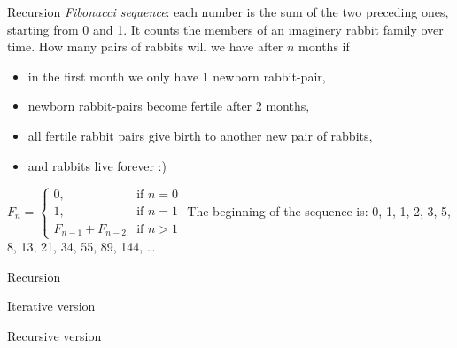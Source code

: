 \documentclass[usenames,dvipsnames,aspectratio=169]{beamer}
\begin{document}
\begin{frame}{Recursion}
  \emph{Fibonacci sequence}: each number is the sum of the two preceding ones, starting from 0 and 1. It counts the members of an imaginery rabbit family over time. How many pairs of rabbits will we have after $n$ months if
  \begin{itemize}
    \item in the first month we only have 1 newborn rabbit-pair,
    \item newborn rabbit-pairs become fertile after 2 months,
    \item all fertile rabbit pairs give birth to another new pair of rabbits,
    \item and rabbits live forever :)
  \end{itemize}
  \vfill
  $F_n = \left\{ \begin{array}{ll}
    0, & \textrm{if $n=0$}\\
    1, & \textrm{if $n=1$}\\
    F_{n-1} + F_{n-2} & \textrm{if $n>1$}
  \end{array} \right.$
  \vfill
  The beginning of the sequence is: 0, 1, 1, 2, 3, 5, 8, 13, 21, 34, 55, 89, 144, \dots
\end{frame}

\begin{frame}{Recursion}
  \scriptsize
  \begin{exampleblock}{ Iterative version}
    \scriptsize
    \vspace{-.3cm}
    
    \vspace{-.3cm}
  \end{exampleblock}
  \begin{exampleblock}{ Recursive version}
    \scriptsize
    \vspace{-.3cm}
    
    \vspace{-.3cm}
  \end{exampleblock}
\end{frame}
\end{document}

